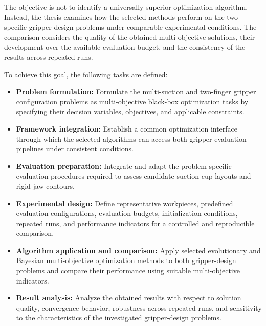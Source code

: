 The objective is not to identify a universally superior optimization algorithm. Instead, the thesis examines how the selected methods perform on the
two specific gripper-design problems under comparable experimental conditions. The comparison considers the quality of the obtained
multi-objective solutions, their development over the available evaluation budget, and the consistency of the results across repeated runs.

To achieve this goal, the following tasks are defined:

\begin{itemize}

    \item \textbf{Problem formulation:}
    Formulate the multi-suction and two-finger gripper configuration problems as multi-objective black-box optimization tasks by specifying their
    decision variables, objectives, and applicable constraints.

    \item \textbf{Framework integration:}
    Establish a common optimization interface through which the selected algorithms can access both gripper-evaluation pipelines under consistent
    conditions.

    \item \textbf{Evaluation preparation:}
    Integrate and adapt the problem-specific evaluation procedures required to assess candidate suction-cup layouts and rigid jaw contours.

    \item \textbf{Experimental design:}
    Define representative workpieces, predefined evaluation configurations, evaluation budgets, initialization conditions, repeated runs, and
    performance indicators for a controlled and reproducible comparison.

    \item \textbf{Algorithm application and comparison:}
    Apply selected evolutionary and Bayesian multi-objective optimization methods to both gripper-design problems and compare their performance using
    suitable multi-objective indicators.

    \item \textbf{Result analysis:}
    Analyze the obtained results with respect to solution quality, convergence behavior, robustness across repeated runs, and sensitivity to the
    characteristics of the investigated gripper-design problems.
    
\end{itemize}